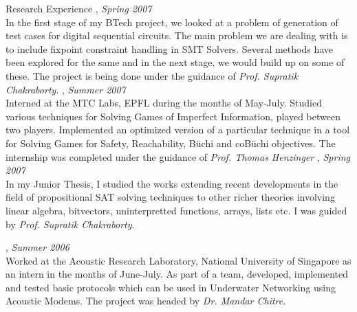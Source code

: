 \documentclass[final]{resume}
\begin{document}

\begin{category}{Research Experience}
, \emph{Spring 2007}\\
In the first stage of my BTech project, we looked at a problem of generation of test cases for digital sequential circuits. The main problem we are dealing with is to include fixpoint constraint handling in SMT Solvers. Several methods have been explored for the same and in the next stage, we would build up on some of these. The project is being done under the guidance of \emph{Prof. Supratik Chakraborty}.
\pagebreak
{}, \emph{Summer 2007}\\
Interned at the MTC Labs, EPFL during the months of May-July. Studied various techniques for Solving Games of Imperfect Information, played between two players. Implemented an optimized version of a particular technique in a tool for Solving Games for Safety, Reachability, B\"{u}chi and coB\"{u}chi objectives. The internship was completed under the guidance of \emph{Prof. Thomas Henzinger}
, \emph{Spring 2007}\\
In my Junior Thesis, I studied the works extending recent developments in the field of propositional SAT solving techniques to other richer theories involving linear algebra, bitvectors, uninterpretted functions, arrays, lists etc. I was guided by \emph{Prof. Supratik Chakraborty}.

, \emph{Summer 2006}\\
Worked at the Acoustic Research Laboratory, National University of Singapore as an intern in the months of June-July. As part of a team, developed, implemented and tested basic protocols which can be used in Underwater Networking using Acoustic Modems. The project was headed by \emph{Dr. Mandar Chitre}.
\end{category}
\vspace{1pt}


\end{document}
